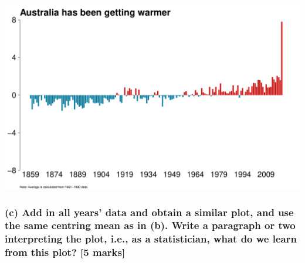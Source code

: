 \documentclass[]{article}
\begin{document}
\includegraphics{Assignment3_files/figure-latex/unnamed-chunk-7-1.pdf}

\subsubsection{(c) Add in all years' data and obtain a similar plot, and
use the same centring mean as in (b). Write a paragraph or two
interpreting the plot, i.e., as a statistician, what do we learn from
this plot? {[}5
marks{]}}\label{c-add-in-all-years-data-and-obtain-a-similar-plot-and-use-the-same-centring-mean-as-in-b.-write-a-paragraph-or-two-interpreting-the-plot-i.e.-as-a-statistician-what-do-we-learn-from-this-plot-5-marks}
\end{document}
